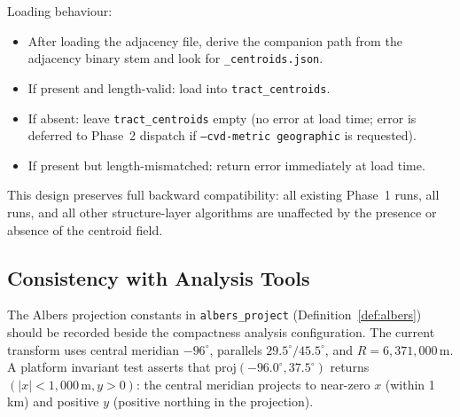 Loading behaviour:
\begin{itemize}
\item After loading the adjacency file, derive the companion path from the
  adjacency binary stem and look for \texttt{\_centroids.json}.
\item If present and length-valid: load into \texttt{tract\_centroids}.
\item If absent: leave \texttt{tract\_centroids} empty (no error at load
  time; error is deferred to Phase~2 dispatch if \texttt{--cvd-metric geographic}
  is requested).
\item If present but length-mismatched: return error immediately at load time.
\end{itemize}

This design preserves full backward compatibility: all existing Phase~1
\cvd{} runs, all \metis{} runs, and all other structure-layer algorithms
are unaffected by the presence or absence of the centroid field.

\subsection{Consistency with Analysis Tools}

The Albers projection constants in \texttt{albers\_project}
(Definition~\ref{def:albers}) should be recorded beside the compactness
analysis configuration. The current transform uses central meridian
$-96^{\circ}$, parallels $29.5^{\circ}/45.5^{\circ}$, and
$R = 6{,}371{,}000$\,m.
A platform invariant test asserts that
$\mathrm{proj}(-96.0^{\circ}, 37.5^{\circ})$ returns $(|x| < 1{,}000\,\mathrm{m}, y > 0)$:
the central meridian projects to near-zero $x$ (within 1\,km) and positive $y$
(positive northing in the projection).

